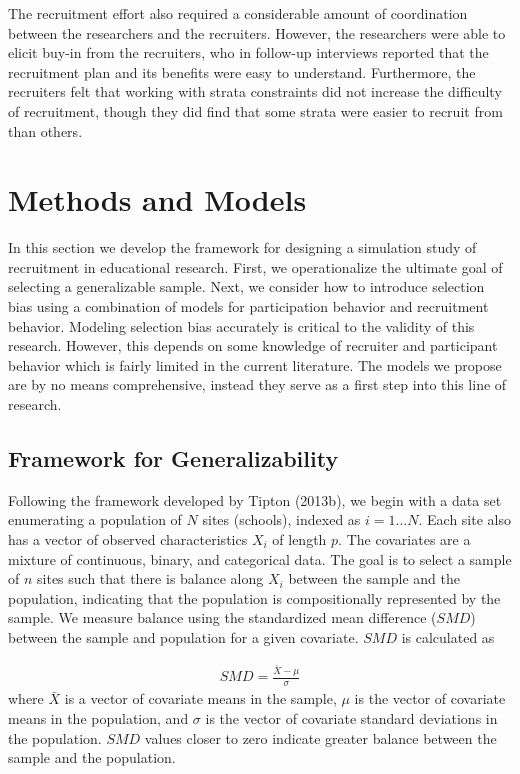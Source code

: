 \documentclass[english,man,floatsintext]{apa6}
\begin{document}
The recruitment effort also required a considerable amount of coordination between the researchers and the recruiters. However, the researchers were able to elicit buy-in from the recruiters, who in follow-up interviews reported that the recruitment plan and its benefits were easy to understand. Furthermore, the recruiters felt that working with strata constraints did not increase the difficulty of recruitment, though they did find that some strata were easier to recruit from than others.

\hypertarget{methods-and-models}{%
\section{Methods and Models}\label{methods-and-models}}

In this section we develop the framework for designing a simulation study of recruitment in educational research. First, we operationalize the ultimate goal of selecting a generalizable sample. Next, we consider how to introduce selection bias using a combination of models for participation behavior and recruitment behavior. Modeling selection bias accurately is critical to the validity of this research. However, this depends on some knowledge of recruiter and participant behavior which is fairly limited in the current literature. The models we propose are by no means comprehensive, instead they serve as a first step into this line of research.

\hypertarget{framework-for-generalizability}{%
\subsection{Framework for Generalizability}\label{framework-for-generalizability}}

Following the framework developed by Tipton (2013b), we begin with a data set enumerating a population of \(N\) sites (schools), indexed as \(i = 1 ... N\). Each site also has a vector of observed characteristics \(X_i\) of length \(p\). The covariates are a mixture of continuous, binary, and categorical data. The goal is to select a sample of \(n\) sites such that there is balance along \(X_i\) between the sample and the population, indicating that the population is compositionally represented by the sample. We measure balance using the standardized mean difference (\(SMD\)) between the sample and population for a given covariate. \(SMD\) is calculated as

\begin{align} \label{eq:SMD}
SMD = \frac{\bar{X}-\mu}{\sigma}
\end{align}
where \(\bar{X}\) is a vector of covariate means in the sample, \(\mu\) is the vector of covariate means in the population, and \(\sigma\) is the vector of covariate standard deviations in the population. \(SMD\) values closer to zero indicate greater balance between the sample and the population.
\end{document}
